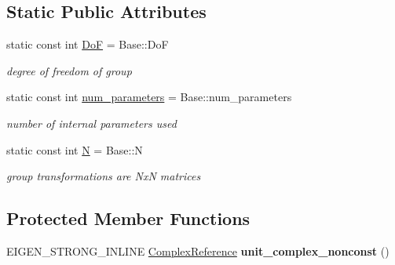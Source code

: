 \subsection*{Static Public Attributes}
\begin{DoxyCompactItemize}
\item 
static const int \hyperlink{class_sophus_1_1_s_o2_group_a849f639dd9eeb6a28f8c3b03f90ac4f4}{DoF} = Base\+::\+DoF\hypertarget{class_sophus_1_1_s_o2_group_a849f639dd9eeb6a28f8c3b03f90ac4f4}{}\label{class_sophus_1_1_s_o2_group_a849f639dd9eeb6a28f8c3b03f90ac4f4}

\begin{DoxyCompactList}\small\item\em degree of freedom of group \end{DoxyCompactList}\item 
static const int \hyperlink{class_sophus_1_1_s_o2_group_a80b788060cfccc5ae1cb3ff89abeb94e}{num\+\_\+parameters} = Base\+::num\+\_\+parameters\hypertarget{class_sophus_1_1_s_o2_group_a80b788060cfccc5ae1cb3ff89abeb94e}{}\label{class_sophus_1_1_s_o2_group_a80b788060cfccc5ae1cb3ff89abeb94e}

\begin{DoxyCompactList}\small\item\em number of internal parameters used \end{DoxyCompactList}\item 
static const int \hyperlink{class_sophus_1_1_s_o2_group_a356218141be974b71be760aa837caf11}{N} = Base\+::N\hypertarget{class_sophus_1_1_s_o2_group_a356218141be974b71be760aa837caf11}{}\label{class_sophus_1_1_s_o2_group_a356218141be974b71be760aa837caf11}

\begin{DoxyCompactList}\small\item\em group transformations are NxN matrices \end{DoxyCompactList}\end{DoxyCompactItemize}
\subsection*{Protected Member Functions}
\begin{DoxyCompactItemize}
\item 
E\+I\+G\+E\+N\+\_\+\+S\+T\+R\+O\+N\+G\+\_\+\+I\+N\+L\+I\+NE \hyperlink{class_sophus_1_1_s_o2_group_a2dc36b32ca3cec6727367d586d3263c6}{Complex\+Reference} {\bfseries unit\+\_\+complex\+\_\+nonconst} ()\hypertarget{class_sophus_1_1_s_o2_group_a3b44e6355030107733fc96cab4a31074}{}\label{class_sophus_1_1_s_o2_group_a3b44e6355030107733fc96cab4a31074}

\end{DoxyCompactItemize}
